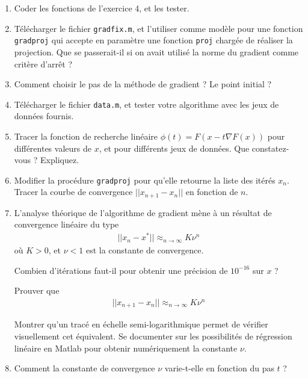 \documentclass[10pt,a4paper,fleqn]{report}
\begin{document}
\begin{enumerate}
\item Coder les fonctions de l'exercice 4, et les tester.
\item Télécharger le fichier \verb+gradfix.m+, et l'utiliser comme
  modèle pour une fonction \verb+gradproj+ qui accepte en paramètre
  une fonction \verb+proj+ chargée de réaliser la projection. Que se
  passerait-il si on avait utilisé la norme du gradient comme critère
  d'arrêt ?
\item Comment choisir le pas de la méthode de gradient ? Le point
  initial ?
\item Télécharger le fichier \verb+data.m+, et tester votre algorithme
  avec les jeux de données fournis.
\item Tracer la fonction de recherche linéaire $\phi(t) = F(x-t\nabla
  F(x))$ pour différentes valeurs de $x$, et pour différents jeux de
  données. Que constatez-vous ? Expliquez.
\item Modifier la procédure \verb+gradproj+ pour qu'elle retourne la
  liste des itérés $x_{n}$. Tracer la courbe de convergence $||x_{n+1}
  - x_{n}||$ en fonction de $n$.
\item L'analyse théorique de l'algorithme de gradient mène à un
  résultat de convergence linéaire du type
  \begin{align*}
    ||x_{n} - x^{*}|| \approx_{n\to \infty} K \nu^{n}
  \end{align*}
  où $K > 0$, et $\nu < 1$ est la constante de convergence.

  Combien d'itérations faut-il pour obtenir une précision de
  $10^{-16}$ sur $x$ ?
  
  Prouver que
  \begin{align*}
    ||x_{n+1} - x_{n}|| \approx_{n \to \infty} K \nu^{n}
  \end{align*}

  Montrer qu'un tracé en échelle semi-logarithmique permet de vérifier
  visuellement cet équivalent. Se documenter sur les possibilités de
  régression linéaire en Matlab pour obtenir numériquement la constante
  $\nu$.
\item Comment la constante de convergence $\nu$ varie-t-elle en
  fonction du pas $t$ ?
\end{enumerate}
\end{document}

